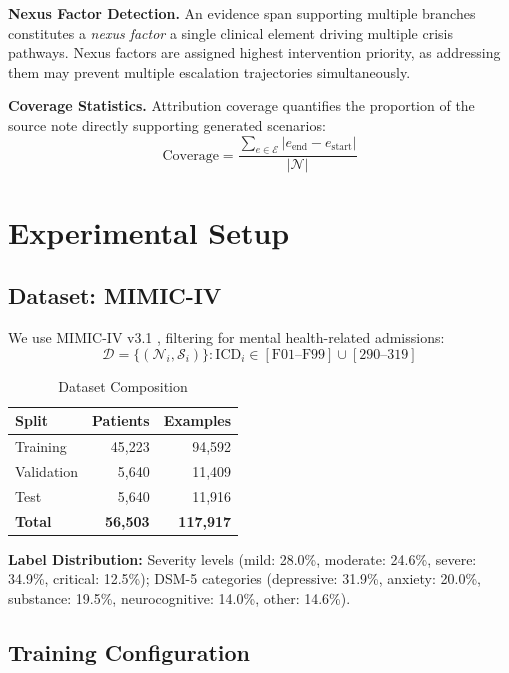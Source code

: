 \documentclass[conference]{IEEEtran}
\begin{document}
\textbf{Nexus Factor Detection.} An evidence span supporting multiple branches constitutes a \textit{nexus factor} a single clinical element driving multiple crisis pathways. Nexus factors are assigned highest intervention priority, as addressing them may prevent multiple escalation trajectories simultaneously.

\textbf{Coverage Statistics.} Attribution coverage quantifies the proportion of the source note directly supporting generated scenarios:
\begin{equation}
    \text{Coverage} = \frac{\sum_{e \in \mathcal{E}} |e_{\text{end}} - e_{\text{start}}|}{|\mathcal{N}|}
\end{equation}

\section{Experimental Setup}

\subsection{Dataset: MIMIC-IV}

We use MIMIC-IV v3.1 \cite{b14}, filtering for mental health-related admissions:
\begin{equation}
    \mathcal{D} = \{(\mathcal{N}_i, \mathcal{S}_i)\} : \text{ICD}_i \in [\text{F01--F99}] \cup [290\text{--}319]
\end{equation}

\begin{table}[h]
\caption{Dataset Composition}
\label{tab:dataset}
\centering
\begin{tabular}{lrr}
\toprule
\textbf{Split} & \textbf{Patients} & \textbf{Examples} \\
\midrule
Training & 45,223 & 94,592 \\
Validation & 5,640 & 11,409 \\
Test & 5,640 & 11,916 \\
\midrule
\textbf{Total} & \textbf{56,503} & \textbf{117,917} \\
\bottomrule
\end{tabular}
\end{table}

\textbf{Label Distribution:} Severity levels (mild: 28.0\%, moderate: 24.6\%, severe: 34.9\%, critical: 12.5\%); DSM-5 categories (depressive: 31.9\%, anxiety: 20.0\%, substance: 19.5\%, neurocognitive: 14.0\%, other: 14.6\%).

\subsection{Training Configuration}
\end{document}
